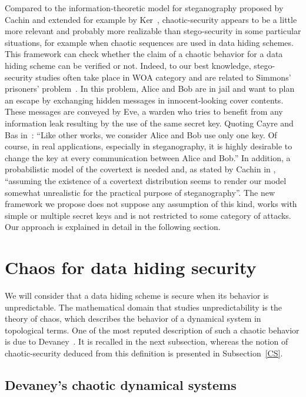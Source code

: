 \documentclass{llncs}
\begin{document}
Compared to the information-theoretic model for steganography proposed by Cachin \cite{Cachin2004} and extended for example by Ker~\cite{Ker06}, chaotic-security appears to be a little more relevant and probably more realizable than stego-security in some particular situations, for example when chaotic sequences are used in data hiding schemes. This framework can check whether the claim of a chaotic behavior for a data hiding scheme can be verified or not. Indeed, to our best knowledge, stego-security studies often take place in WOA category and are related to Simmons' prisoners' problem~\cite{Simmons83}. In this problem, Alice and Bob are in jail and want to plan an escape by exchanging hidden messages in innocent-looking cover contents. These messages are conveyed by Eve, a warden who tries to benefit from any information leak resulting by the use of the same secret key. Quoting Cayre and Bas in~\cite{Cayre2008}: ``Like other works, we consider Alice and Bob use only one key. Of course, in real applications, especially in steganography, it is highly desirable to change the key at every communication between Alice and Bob.'' In addition, a probabilistic model of the covertext is needed and, as stated by Cachin in \cite{Cachin2004}, ``assuming the existence of a covertext distribution seems to render our model somewhat unrealistic for the practical purpose of steganography''. The new framework we propose does not suppose any assumption of this kind, works with simple or multiple secret keys and is not restricted to some category of attacks. Our approach is explained in detail in the following section.





\section{Chaos for data hiding security}
\label{section:Chaos}


We will consider that a data hiding scheme is secure when its behavior is unpredictable. The mathematical domain that studies unpredictability is the theory of chaos, which describes the behavior of a dynamical system in topological terms. One of the most reputed description of such a chaotic behavior is due to Devaney~\cite{Devaney}. It is recalled in the next subsection, whereas the notion of chaotic-security deduced from this definition is presented in Subsection~\ref{CS}. 


\subsection{Devaney's chaotic dynamical systems}
\label{subsection:Devaney}
\end{document}
